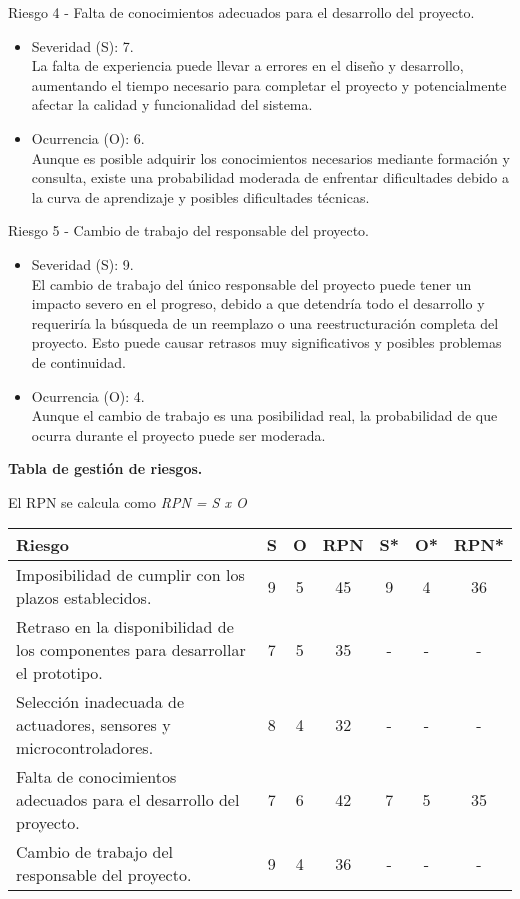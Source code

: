 Riesgo 4 - Falta de conocimientos adecuados para el desarrollo del proyecto.
\begin{itemize}
	\item Severidad (S): 7.\\ La falta de experiencia puede llevar a errores en el diseño
	      y desarrollo, aumentando el tiempo necesario para completar el proyecto y
	      potencialmente afectar la calidad y funcionalidad del sistema.
	\item Ocurrencia (O): 6.\\ Aunque es posible adquirir los conocimientos necesarios
	      mediante formación y consulta, existe una probabilidad moderada de enfrentar
	      dificultades debido a la curva de aprendizaje y posibles dificultades técnicas.
\end{itemize}

Riesgo 5 - Cambio de trabajo del responsable del proyecto.
\begin{itemize}
	\item Severidad (S): 9.\\ El cambio de trabajo del único responsable del proyecto
	      puede tener un impacto severo en el progreso, debido a que detendría todo el
	      desarrollo y requeriría la búsqueda de un reemplazo o una reestructuración
	      completa del proyecto. Esto puede causar retrasos muy significativos y posibles
	      problemas de continuidad.
	\item Ocurrencia (O): 4.\\ Aunque el cambio de trabajo es una posibilidad real, la
	      probabilidad de que ocurra durante el proyecto puede ser moderada.
\end{itemize}

\pagebreak

\textbf{Tabla de gestión de riesgos.}

El RPN se calcula como \textit{RPN = S x O}

\begin{table}[H]
	\centering
	\begin{tabularx}{\linewidth}{@{}|X|c|c|c|c|c|c|@{}}
		\hline
		\rowcolor[HTML]{C0C0C0}
		Riesgo                                                & S & O & RPN & S* & O* & RPN* \\ \hline
		Imposibilidad de cumplir con los plazos establecidos. & 9 & 5 & 45  & 9  & 4  & 36   \\ \hline
		Retraso en la disponibilidad de los componentes para
		desarrollar el prototipo.                             & 7 & 5 & 35  & -  & -  & -    \\ \hline
		Selección inadecuada de actuadores, sensores y
		microcontroladores.                                   & 8 & 4 & 32  & -  & -  & -    \\ \hline
		Falta de conocimientos adecuados para el desarrollo del
		proyecto.                                             & 7 & 6 & 42  & 7  & 5  & 35   \\ \hline
		Cambio de trabajo del responsable del proyecto.       & 9 & 4 & 36  & -  & -  & -    \\ \hline
	\end{tabularx}%
\end{table}

